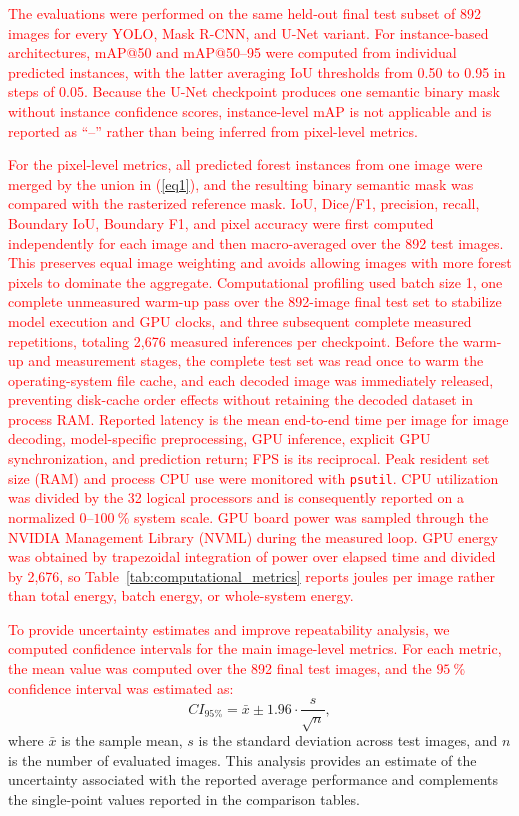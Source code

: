 \documentclass[journal,article,submit,pdftex,moreauthors]{Definitions/mdpi}
\begin{document}
\textcolor{red}{The evaluations were performed on the same held-out final test subset of 892 images for every YOLO, Mask R-CNN, and U-Net variant. For instance-based architectures, mAP@50 and mAP@50--95 were computed from individual predicted instances, with the latter averaging IoU thresholds from 0.50 to 0.95 in steps of 0.05. Because the U-Net checkpoint produces one semantic binary mask without instance confidence scores, instance-level mAP is not applicable and is reported as ``--'' rather than being inferred from pixel-level metrics.}

\textcolor{red}{For the pixel-level metrics, all predicted forest instances from one image were merged by the union in (\ref{eq1}), and the resulting binary semantic mask was compared with the rasterized reference mask. IoU, Dice/F1, precision, recall, Boundary IoU, Boundary F1, and pixel accuracy were first computed independently for each image and then macro-averaged over the 892 test images. This preserves equal image weighting and avoids allowing images with more forest pixels to dominate the aggregate.}
\textcolor{red}{Computational profiling used batch size 1, one complete unmeasured warm-up pass over the 892-image final test set to stabilize model execution and GPU clocks, and three subsequent complete measured repetitions, totaling 2,676 measured inferences per checkpoint. Before the warm-up and measurement stages, the complete test set was read once to warm the operating-system file cache, and each decoded image was immediately released, preventing disk-cache order effects without retaining the decoded dataset in process RAM. Reported latency is the mean end-to-end time per image for image decoding, model-specific preprocessing, GPU inference, explicit GPU synchronization, and prediction return; FPS is its reciprocal. Peak resident set size (RAM) and process CPU use were monitored with \texttt{psutil}. CPU utilization was divided by the 32 logical processors and is consequently reported on a normalized $0$--$100~\%$ system scale. GPU board power was sampled through the NVIDIA Management Library (NVML) during the measured loop. GPU energy was obtained by trapezoidal integration of power over elapsed time and divided by 2,676, so Table~\ref{tab:computational_metrics} reports joules per image rather than total energy, batch energy, or whole-system energy.}

\textcolor{red}{To provide uncertainty estimates and improve repeatability analysis, we computed confidence intervals for the main image-level metrics. For each metric, the mean value was computed over the 892 final test images, and the $95~\%$ confidence interval was estimated as:}
\begin{equation}
CI_{95\%} = \bar{x} \pm 1.96 \cdot \frac{s}{\sqrt{n}},
\end{equation}
where $\bar{x}$ is the sample mean, $s$ is the standard deviation across test images, and $n$ is the number of evaluated images. This analysis provides an estimate of the uncertainty associated with the reported average performance and complements the single-point values reported in the comparison tables.
\end{document}

